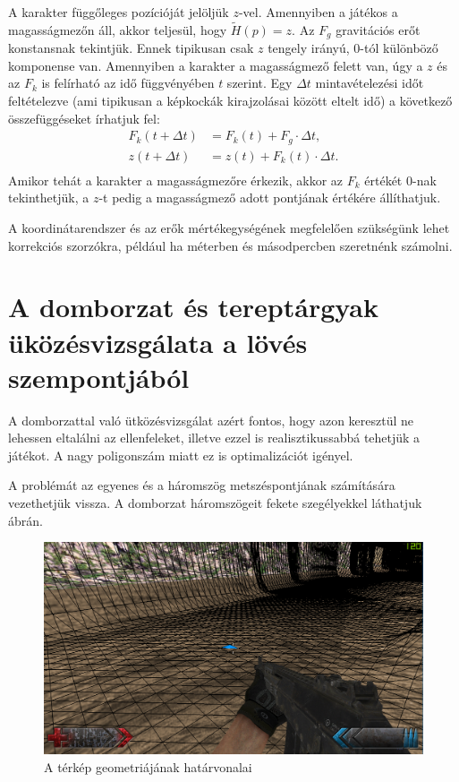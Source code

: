 A karakter függőleges pozícióját jelöljük $z$-vel. Amennyiben a játékos a magasságmezőn áll, akkor teljesül, hogy $\widetilde{H}(p) = z$. Az $F_g$ gravitációs erőt konstansnak tekintjük. Ennek tipikusan csak $z$ tengely irányú, $0$-tól különböző komponense van. Amennyiben a karakter a magasságmező felett van, úgy a $z$ és az $F_k$ is felírható az idő függvényében $t$ szerint. Egy $\Delta t$ mintavételezési időt feltételezve (ami tipikusan a képkockák kirajzolásai között eltelt idő) a következő összefüggéseket írhatjuk fel:
\begin{align*}
F_k(t + \Delta t) &= F_k(t) + F_g \cdot \Delta t, \\
z(t + \Delta t) &= z(t) + F_k(t) \cdot \Delta t. \\
\end{align*}
Amikor tehát a karakter a magasságmezőre érkezik, akkor az $F_k$ értékét $0$-nak tekinthetjük, a $z$-t pedig a magasságmező adott pontjának értékére állíthatjuk.

A koordinátarendszer és az erők mértékegységének megfelelően szükségünk lehet korrekciós szorzókra, például ha méterben és másodpercben szeretnénk számolni.
 
\section{A domborzat és tereptárgyak üközésvizsgálata a lövés szempontjából}

A domborzattal való ütközésvizsgálat azért fontos, hogy azon keresztül ne lehessen eltalálni az ellenfeleket, illetve ezzel is realisztikussabbá tehetjük a játékot. A nagy poligonszám miatt ez is optimalizációt igényel.

A problémát az egyenes és a háromszög metszéspontjának számítására vezethetjük vissza. A domborzat háromszögeit fekete szegélyekkel láthatjuk  ábrán.

\begin{figure}[h]
\centering
\includegraphics[scale=0.4]{kepek/map_wireframe.png}
\caption{A térkép geometriájának határvonalai}
\label{fig:wireframe}
\end{figure}

